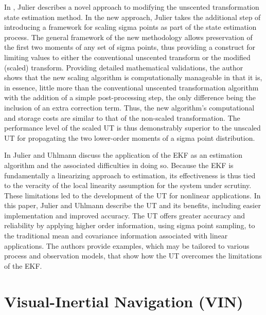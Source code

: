 In \cite{Julier2002}, Julier describes a novel approach to modifying the unscented transformation state estimation method. In the new approach, Julier takes the additional step of introducing a framework for scaling sigma points as part of the state estimation process. The general framework of the new methodology allows preservation of the first two moments of any set of sigma points, thus providing a construct for limiting values to either the conventional unscented transform or the modified (scaled) transform. Providing detailed mathematical validations, the author shows that the new scaling algorithm is computationally manageable in that it is, in essence, little more than the conventional unscented transformation algorithm with the addition of a simple post-processing step, the only difference being the inclusion of an extra correction term. Thus, the new algorithm's computational and storage costs are similar to that of the non-scaled transformation. The performance level of the scaled UT is thus demonstrably superior to the unscaled UT for propagating the two lower-order moments of a sigma point distribution.

In \cite{Julier2004} Julier and Uhlmann discuss the application of the EKF as an estimation algorithm and the associated difficulties in doing so. Because the EKF is fundamentally a linearizing approach to estimation, its effectiveness is thus tied to the veracity of the local linearity assumption for the system under scrutiny. These limitations led to the development of the UT for nonlinear applications. In this paper, Julier and Uhlmann describe the UT and its benefits, including easier implementation and improved accuracy. The UT offers greater accuracy and reliability by applying higher order information, using sigma point sampling, to the traditional mean and covariance information associated with linear applications. The authors provide examples, which may be tailored to various process and observation models, that show how the UT overcomes the limitations of the EKF.

\section{Visual-Inertial Navigation (VIN)}


